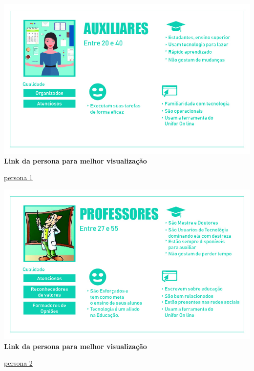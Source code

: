 \begin{center}

  \includegraphics[scale=0.5]{imagens/persona.jpg}\\

  \textbf{Link da persona para melhor visualização}

  \href{https://goo.gl/Fv4L6r}{persona 1}

\end{center}

\begin{center}

  \includegraphics[scale=0.5]{imagens/persona2.jpg}\\

  \textbf{Link da persona para melhor visualização}

  \href{https://goo.gl/rTJupp}{persona 2}

\end{center}



\newpage
